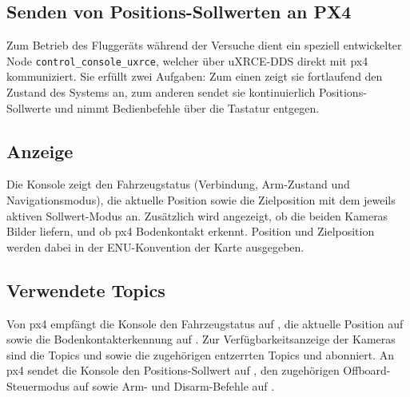 \subsection{Senden von Positions-Sollwerten an PX4}
\label{sec:bedienkonsole}
Zum Betrieb des Fluggeräts während der Versuche dient ein speziell entwickelter Node \texttt{control\_console\_uxrce}, welcher über uXRCE-DDS direkt mit \gls{px4} kommuniziert.
Sie erfüllt zwei Aufgaben: Zum einen zeigt sie fortlaufend den Zustand des Systems an, zum anderen sendet sie kontinuierlich Positions-Sollwerte und nimmt Bedienbefehle über die Tastatur entgegen.

\subsection*{Anzeige}
Die Konsole zeigt den Fahrzeugstatus (Verbindung, Arm-Zustand und Navigationsmodus), die aktuelle Position sowie die Zielposition mit dem jeweils aktiven Sollwert-Modus an.
Zusätzlich wird angezeigt, ob die beiden Kameras Bilder liefern, und ob \gls{px4} Bodenkontakt erkennt.
Position und Zielposition werden dabei in der ENU-Konvention der Karte ausgegeben.

\subsection*{Verwendete Topics}
\begin{sloppypar}
Von \gls{px4} empfängt die Konsole den Fahrzeugstatus auf , die aktuelle Position auf  sowie die Bodenkontakterkennung auf .
Zur Verfügbarkeitsanzeige der Kameras sind die Topics  und  sowie die zugehörigen entzerrten Topics  und  abonniert.
An \gls{px4} sendet die Konsole den Positions-Sollwert auf , den zugehörigen Offboard-Steuermodus auf  sowie Arm- und Disarm-Befehle auf .
\end{sloppypar}

